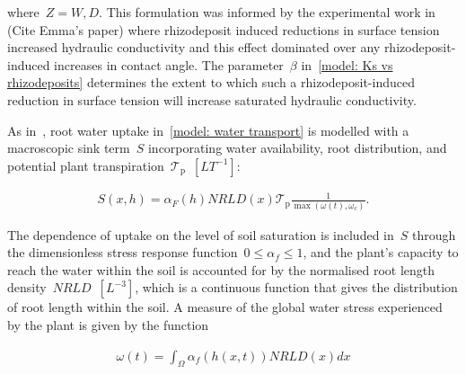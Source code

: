 \documentclass[11pt,a4paper]{article}
\numberwithin{equation}{section}
\begin{document}
where~$Z=W,D$. This formulation was informed by the experimental work in (Cite Emma's paper) where rhizodeposit induced reductions in surface tension increased hydraulic conductivity and this effect dominated over any rhizodeposit-induced increases in contact angle. The parameter~$\beta$ in~\eqref{model: Ks vs rhizodeposits} determines the extent to which such a rhizodeposit-induced reduction in surface tension will increase saturated hydraulic conductivity.

As in~\citep{vsimuunek2009modeling}, root water uptake in~\eqref{model: water transport} is modelled with a macroscopic sink term~$S$ incorporating water availability, root distribution, and potential plant transpiration~$\mathcal{T}_\text{p}$~$[LT^{-1}]$:
\begin{linenomath*}
	\begin{equation}\label{model: root water uptake}
		\begin{aligned}
			S(x, h) = \alpha_F(h)NRLD(x)\mathcal{T}_\text{p}\frac{1}{\max{(\omega(t),\omega_c)}}.
		\end{aligned}
	\end{equation}
\end{linenomath*}   
The dependence of uptake on the level of soil saturation is included in~$S$ through the dimensionless stress response function~$0\leq\alpha_f\leq1$, and  the plant's capacity to reach the water within the soil is accounted for by the normalised root length density~$NRLD$~$[L^{-3}]$, which is a continuous function that gives the distribution of root length within the soil. A measure of the global water stress experienced by the plant is given by the function
\begin{linenomath*}
	\begin{equation}\label{model: global water stress}
		\begin{aligned}
			\omega(t) = \int_\Omega\alpha_f(h(x, t))NRLD(x)dx
		\end{aligned}
	\end{equation}
\end{linenomath*}	
	
\end{document}
